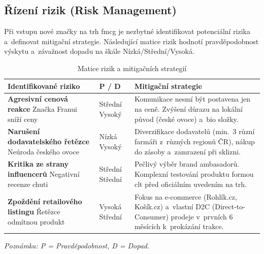 \subsection{Řízení rizik (Risk Management)}
\label{subsec:res_risk_management}

Při vstupu nové značky na trh \gls{fmcg} je nezbytné identifikovat potenciální rizika a~definovat mitigační strategie. Následující matice rizik hodnotí pravděpodobnost výskytu a~závažnost dopadu na škále Nízká/Střední/Vysoká.

\begin{table}[H]
\centering
\caption{Matice rizik a mitigačních strategií}
\label{tab:risk_matrix}
\begin{tabularx}{\textwidth}{>{\raggedright\arraybackslash}p{4.5cm} >{\raggedright\arraybackslash}p{2cm} >{\raggedright\arraybackslash}X}
\toprule
\textbf{Identifikované riziko} & \textbf{P / D} & \textbf{Mitigační strategie} \\
\midrule
\textbf{Agresivní cenová reakce} \newline Značka Franui sníží ceny & Střední \newline Vysoký & Komunikace nesmí být postavena jen na ceně. Zvýšení důrazu na lokální původ (české ovoce) a~\gls{bio} složky. \\
\midrule
\textbf{Narušení dodavatelského řetězce} \newline Neúroda českého ovoce & Nízká \newline Vysoký & Diverzifikace dodavatelů (min.\ 3 různí farmáři z~různých regionů ČR), nákup do zásoby a~zamrazení při sklizni. \\
\midrule
\textbf{Kritika ze strany influencerů} \newline Negativní recenze chuti & Střední \newline Střední & Pečlivý výběr brand ambasadorů. Komplexní testování produktu formou \gls{clt} před oficiálním uvedením na trh. \\
\midrule
\textbf{Zpoždění retailového listingu} \newline Řetězce odmítnou produkt & Vysoká \newline Střední & Fokus na e-commerce (Rohlík.cz, Košík.cz) a~vlastní D2C (Direct-to-Consumer) prodeje v~prvních 6 měsících k~prokázání trakce. \\
\bottomrule
\end{tabularx}
\begin{tablenotes}\small
\item \textit{Poznámka: P = Pravděpodobnost, D = Dopad.}
\end{tablenotes}
\end{table}

